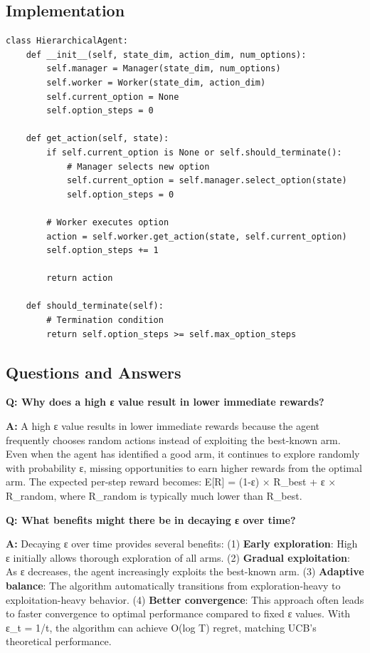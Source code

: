 \documentclass[12pt]{article}
\begin{document}
{{{\subsection{Implementation}

\begin{verbatim}
class HierarchicalAgent:
    def __init__(self, state_dim, action_dim, num_options):
        self.manager = Manager(state_dim, num_options)
        self.worker = Worker(state_dim, action_dim)
        self.current_option = None
        self.option_steps = 0
        
    def get_action(self, state):
        if self.current_option is None or self.should_terminate():
            # Manager selects new option
            self.current_option = self.manager.select_option(state)
            self.option_steps = 0
            
        # Worker executes option
        action = self.worker.get_action(state, self.current_option)
        self.option_steps += 1
        
        return action
        
    def should_terminate(self):
        # Termination condition
        return self.option_steps >= self.max_option_steps
\end{verbatim}

\subsection{Questions and Answers}

\textbf{Q: Why does a high ε value result in lower immediate rewards?}

\textbf{A:} A high ε value results in lower immediate rewards because the agent frequently chooses random actions instead of exploiting the best-known arm. Even when the agent has identified a good arm, it continues to explore randomly with probability ε, missing opportunities to earn higher rewards from the optimal arm. The expected per-step reward becomes: E[R] = (1-ε) × R_best + ε × R_random, where R_random is typically much lower than R_best.

\textbf{Q: What benefits might there be in decaying ε over time?}

\textbf{A:} Decaying ε over time provides several benefits: (1) \textbf{Early exploration}: High ε initially allows thorough exploration of all arms. (2) \textbf{Gradual exploitation}: As ε decreases, the agent increasingly exploits the best-known arm. (3) \textbf{Adaptive balance}: The algorithm automatically transitions from exploration-heavy to exploitation-heavy behavior. (4) \textbf{Better convergence}: This approach often leads to faster convergence to optimal performance compared to fixed ε values. With ε_t = 1/t, the algorithm can achieve O(log T) regret, matching UCB's theoretical performance.

}}}
\end{document}
